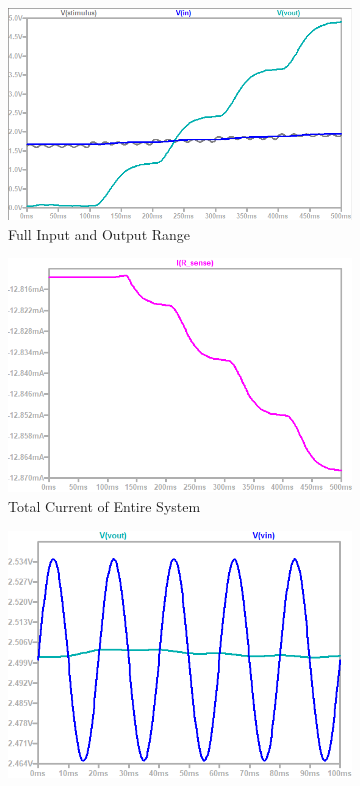 \begin{figure}[h]
 \footnotesize
 \centering
    \begin{subfigure}[]{0.4\textwidth}
              \centering
  		\includegraphics[width=1\linewidth]{./Figures/vout}
		    \caption{Full Input and Output Range} \label{subfig:vout}
     \end{subfigure}
     \begin{subfigure}[]{0.5\textwidth}
             \centering
  		\includegraphics[width=1.0\linewidth]{./Figures/current}
		   \caption{Total Current of Entire System} \label{subfig:current}
     \end{subfigure}
    \begin{subfigure}[]{0.45\textwidth}
              \centering
  		\includegraphics[width=1\linewidth]{./Figures/noise}

\end{subfigure}
\end{figure}
